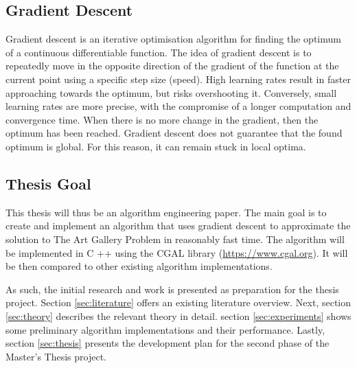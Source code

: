 \subsection{Gradient Descent}

Gradient descent is an iterative optimisation algorithm for finding the optimum of a continuous differentiable function. The idea of gradient descent is to repeatedly move in the opposite direction of the gradient of the function at the current point using a specific step size (speed). High learning rates result in faster approaching towards the optimum, but risks overshooting it. Conversely, small learning rates are more precise, with the compromise of a longer computation and convergence time. 
When there is no more change in the gradient, then the optimum has been reached. Gradient descent does not guarantee that the found optimum is global. For this reason, it can remain stuck in local optima.

\subsection{Thesis Goal}

This thesis will thus be an algorithm engineering paper. The main goal is to create and implement an algorithm that uses gradient descent to approximate the solution to The Art Gallery Problem \cite{o1987art} in reasonably fast time. The algorithm will be implemented in C ++ using the CGAL library (\url{https://www.cgal.org}). It will be then compared to other existing algorithm implementations.

As such, the initial research and work is presented as preparation for the thesis project. Section \ref{sec:literature} offers an existing literature overview. Next, section \ref{sec:theory} describes the relevant theory in detail.
section \ref{sec:experiments} shows some preliminary algorithm implementations and their performance.
Lastly, section \ref{sec:thesis} presents the development plan for the second phase of the Master's Thesis project.